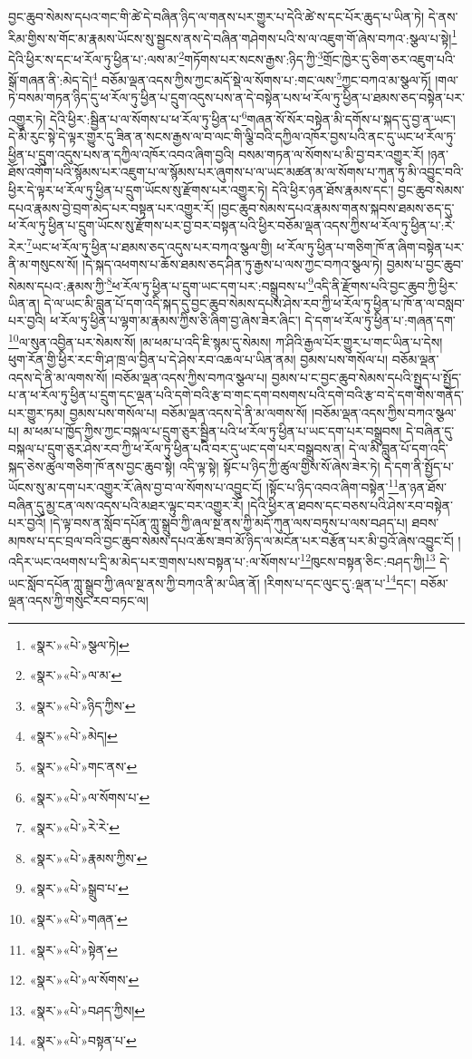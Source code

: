 བྱང་ཆུབ་སེམས་དཔའ་གང་གི་ཚེ་དེ་བཞིན་ཉིད་ལ་གནས་པར་གྱུར་པ་དེའི་ཚེ་ས་དང་པོར་ཆུད་པ་ཡིན་ཏེ། དེ་ནས་རིམ་གྱིས་ས་གོང་མ་རྣམས་ཡོངས་སུ་སྦྱངས་ནས་དེ་བཞིན་གཤེགས་པའི་ས་ལ་འཇུག་གོ་ཞེས་བཀའ་:སྩལ་པ་སྟེ།\footnote{«སྣར་»«པེ་»སྩལ་ཏེ།} དེའི་ཕྱིར་ས་དང་ཕ་རོལ་ཏུ་ཕྱིན་པ་:ལས་མ་\footnote{«སྣར་»«པེ་»ལ་མ་}གཏོགས་པར་སངས་རྒྱས་:ཉིད་ཀྱི་\footnote{«སྣར་»«པེ་»ཉིད་ཀྱིས་}གྲོང་ཁྱེར་དུ་ཅིག་ཅར་འཇུག་པའི་སྒོ་གཞན་ནི་:མེད་དེ།\footnote{«སྣར་»«པེ་»མེད།} བཅོམ་ལྡན་འདས་ཀྱིས་ཀྱང་མདོ་སྡེ་ལ་སོགས་པ་:གང་ལས་\footnote{«སྣར་»«པེ་»གང་ནས་}ཀྱང་བཀའ་མ་སྩལ་ཏོ། །གལ་ཏེ་བསམ་གཏན་ཉིད་དུ་ཕ་རོལ་ཏུ་ཕྱིན་པ་དྲུག་འདུས་པས་ན་དེ་བསྟེན་པས་ཕ་རོལ་ཏུ་ཕྱིན་པ་ཐམས་ཅད་བསྟེན་པར་འགྱུར་ཏེ། དེའི་ཕྱིར་:སྦྱིན་པ་ལ་སོགས་པ་ཕ་རོལ་ཏུ་ཕྱིན་པ་\footnote{«སྣར་»«པེ་»ལ་སོགས་པ་}གཞན་སོ་སོར་བསྟེན་མི་དགོས་པ་སྐད་དུ་བྱ་ན་ཡང་། དེ་མི་རུང་སྟེ་དེ་ལྟར་གྱུར་དུ་ཟིན་ན་སངས་རྒྱས་ལ་བ་ལང་གི་ལྕི་བའི་དཀྱིལ་འཁོར་བྱས་པའི་ནང་དུ་ཡང་ཕ་རོལ་ཏུ་ཕྱིན་པ་དྲུག་འདུས་པས་ན་དཀྱིལ་འཁོར་འབའ་ཞིག་བྱའི། བསམ་གཏན་ལ་སོགས་པ་མི་བྱ་བར་འགྱུར་རོ། །ཉན་ཐོས་འགོག་པའི་སྙོམས་པར་འཇུག་པ་ལ་སྙོམས་པར་ཞུགས་པ་ལ་ཡང་མཚན་མ་ལ་སོགས་པ་ཀུན་ཏུ་མི་འབྱུང་བའི་ཕྱིར་དེ་ལྟར་ཕ་རོལ་ཏུ་ཕྱིན་པ་དྲུག་ཡོངས་སུ་རྫོགས་པར་འགྱུར་ཏེ། དེའི་ཕྱིར་ཉན་ཐོས་རྣམས་དང་། བྱང་ཆུབ་སེམས་དཔའ་རྣམས་བྱེ་བྲག་མེད་པར་བསྟན་པར་འགྱུར་རོ། །བྱང་ཆུབ་སེམས་དཔའ་རྣམས་གནས་སྐབས་ཐམས་ཅད་དུ་ཕ་རོལ་ཏུ་ཕྱིན་པ་དྲུག་ཡོངས་སུ་རྫོགས་པར་བྱ་བར་བསྟན་པའི་ཕྱིར་བཅོམ་ལྡན་འདས་ཀྱིས་ཕ་རོལ་ཏུ་ཕྱིན་པ་:རེ་རེར་\footnote{«སྣར་»«པེ་»རེ་རེ་}ཡང་ཕ་རོལ་ཏུ་ཕྱིན་པ་ཐམས་ཅད་འདུས་པར་བཀའ་སྩལ་གྱི། ཕ་རོལ་ཏུ་ཕྱིན་པ་གཅིག་ཁོ་ན་ཞིག་བསྟེན་པར་ནི་མ་གསུངས་སོ། །དེ་སྐད་འཕགས་པ་ཆོས་ཐམས་ཅད་ཤིན་ཏུ་རྒྱས་པ་ལས་ཀྱང་བཀའ་སྩལ་ཏེ། བྱམས་པ་བྱང་ཆུབ་སེམས་དཔའ་:རྣམས་ཀྱི་\footnote{«སྣར་»«པེ་»རྣམས་ཀྱིས་}ཕ་རོལ་ཏུ་ཕྱིན་པ་དྲུག་ཡང་དག་པར་:བསྒྲུབས་པ་\footnote{«སྣར་»«པེ་»སྒྲུབ་པ་}འདི་ནི་རྫོགས་པའི་བྱང་ཆུབ་ཀྱི་ཕྱིར་ཡིན་ན། དེ་ལ་ཡང་མི་བླུན་པོ་དག་འདི་སྐད་དུ་བྱང་ཆུབ་སེམས་དཔས་ཤེས་རབ་ཀྱི་ཕ་རོལ་ཏུ་ཕྱིན་པ་ཁོ་ན་ལ་བསླབ་པར་བྱའི། ཕ་རོལ་ཏུ་ཕྱིན་པ་ལྷག་མ་རྣམས་ཀྱིས་ཅི་ཞིག་བྱ་ཞེས་ཟེར་ཞིང་། དེ་དག་ཕ་རོལ་ཏུ་ཕྱིན་པ་:གཞན་དག་\footnote{«སྣར་»«པེ་»གཞན་}ལ་སུན་འབྱིན་པར་སེམས་སོ། །མ་ཕམ་པ་འདི་ཇི་སྙམ་དུ་སེམས། ཀ་ཤིའི་རྒྱལ་པོར་གྱུར་པ་གང་ཡིན་པ་དེས། ཕུག་རོན་གྱི་ཕྱིར་རང་གི་ཤ་ཁྲ་ལ་བྱིན་པ་དེ་ཤེས་རབ་འཆལ་པ་ཡིན་ནམ། བྱམས་པས་གསོལ་པ། བཅོམ་ལྡན་འདས་དེ་ནི་མ་ལགས་སོ། །བཅོམ་ལྡན་འདས་ཀྱིས་བཀའ་སྩལ་པ། བྱམས་པ་ང་བྱང་ཆུབ་སེམས་དཔའི་སྤྱད་པ་སྤྱོད་པ་ན་ཕ་རོལ་ཏུ་ཕྱིན་པ་དྲུག་དང་ལྡན་པའི་དགེ་བའི་རྩ་བ་གང་དག་བསགས་པའི་དགེ་བའི་རྩ་བ་དེ་དག་གིས་གནོད་པར་གྱུར་ཏམ། བྱམས་པས་གསོལ་པ། བཅོམ་ལྡན་འདས་དེ་ནི་མ་ལགས་སོ། །བཅོམ་ལྡན་འདས་ཀྱིས་བཀའ་སྩལ་པ། མ་ཕམ་པ་ཁྱོད་ཀྱིས་ཀྱང་བསྐལ་པ་དྲུག་ཅུར་སྦྱིན་པའི་ཕ་རོལ་ཏུ་ཕྱིན་པ་ཡང་དག་པར་བསྒྲུབས། དེ་བཞིན་དུ་བསྐལ་པ་དྲུག་ཅུར་ཤེས་རབ་ཀྱི་ཕ་རོལ་ཏུ་ཕྱིན་པའི་བར་དུ་ཡང་དག་པར་བསྒྲུབས་ན། དེ་ལ་མི་བླུན་པོ་དག་འདི་སྐད་ཅེས་ཚུལ་གཅིག་ཁོ་ནས་བྱང་ཆུབ་སྟེ། འདི་ལྟ་སྟེ། སྟོང་པ་ཉིད་ཀྱི་ཚུལ་གྱིས་སོ་ཞེས་ཟེར་ཏེ། དེ་དག་ནི་སྤྱོད་པ་ཡོངས་སུ་མ་དག་པར་འགྱུར་རོ་ཞེས་བྱ་བ་ལ་སོགས་པ་འབྱུང་ངོ། །སྟོང་པ་ཉིད་འབའ་ཞིག་བསྟེན་\footnote{«སྣར་»«པེ་»སྟེན་}ན་ཉན་ཐོས་བཞིན་དུ་མྱ་ངན་ལས་འདས་པའི་མཐར་ལྟུང་བར་འགྱུར་རོ། །དེའི་ཕྱིར་ན་ཐབས་དང་བཅས་པའི་ཤེས་རབ་བསྟེན་པར་བྱའོ། །དེ་ལྟ་བས་ན་སློབ་དཔོན་ཀླུ་སྒྲུབ་ཀྱི་ཞལ་སྔ་ནས་ཀྱི་མདོ་ཀུན་ལས་བཏུས་པ་ལས་བཤད་པ། ཐབས་མཁས་པ་དང་བྲལ་བའི་བྱང་ཆུབ་སེམས་དཔའ་ཆོས་ཟབ་མོ་ཉིད་ལ་མངོན་པར་བརྩོན་པར་མི་བྱའོ་ཞེས་འབྱུང་ངོ། །འདིར་ཡང་འཕགས་པ་དྲི་མ་མེད་པར་གྲགས་པས་བསྟན་པ་:ལ་སོགས་པ་\footnote{«སྣར་»«པེ་»ལ་སོགས་}ཁུངས་བསྟན་ཅིང་:བཤད་ཀྱི།\footnote{«སྣར་»«པེ་»བཤད་ཀྱིས།} དེ་ཡང་སློབ་དཔོན་ཀླུ་སྒྲུབ་ཀྱི་ཞལ་སྔ་ནས་ཀྱི་བཀའ་ནི་མ་ཡིན་ནོ། །རིགས་པ་དང་ལུང་དུ་:ལྡན་པ་\footnote{«སྣར་»«པེ་»བསྟན་པ་}དང་། བཅོམ་ལྡན་འདས་ཀྱི་གསུང་རབ་བཏང་ལ། 